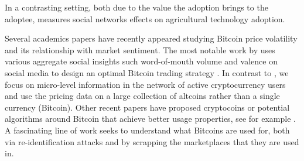 In a contrasting setting, both due to the value the adoption brings to the adoptee, \cite{maertens2013measuring} measures social networks effects on agricultural technology adoption.

Several academics papers have recently appeared studying Bitcoin price volatility and its relationship with market sentiment. The most notable work by \cite{Garcia-bitcoin} uses various aggregate social insights such word-of-mouth volume and valence on social media to design an optimal Bitcoin trading strategy . In contrast to \cite{Garcia-bitcoin}, we focus on micro-level information in the network of active cryptocurrency users and use the pricing data on a large collection of altcoins rather than a single currency (Bitcoin). Other recent papers have proposed cryptocoins or potential algorithms around Bitcoin that achieve better usage properties, see for example \cite{bonneau2014mixcoin}.
A fascinating line of work \cite{meiklejohn2013fistful,soska2015measuring} seeks to understand what Bitcoins are used for, both via re-identification attacks and by scrapping the marketplaces that they are used in.

